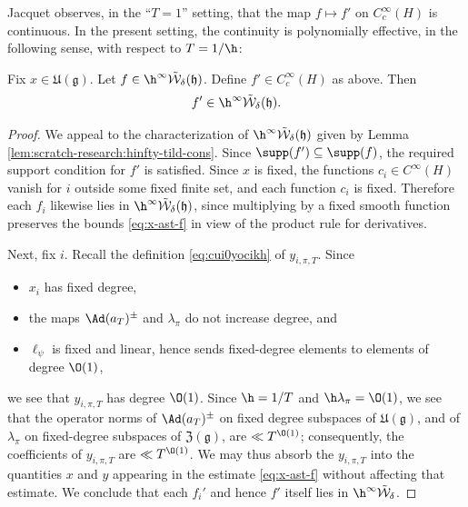 Jacquet observes, in the ``$T=1$'' setting, that the map $f \mapsto f'$ on $C_c^\infty(H)$ is continuous.  In the present setting, the continuity is polynomially effective, in the following sense, with respect to $T = 1/\h$:
\begin{lemma}\label{lem:scratch-research:fix-x-in}
  Fix $x \in \mathfrak{U}(\mathfrak{g})$.  Let $f \in \h^\infty \tilde{\mathcal{W}}_\delta(\mathfrak{h})$.   Define $f' \in C_c^\infty(H)$ as above.  Then
  \begin{equation*}
    f' \in \h^\infty \tilde{\mathcal{W}}_\delta(\mathfrak{h}).
  \end{equation*}
\end{lemma}
\begin{proof}
  We appeal to the characterization of $\h^\infty \tilde{\mathcal{W}}_\delta(\mathfrak{h})$ given by Lemma \ref{lem:scratch-research:hinfty-tild-cons}.  Since $\supp(f') \subseteq \supp(f)$, the required support condition for $f'$ is satisfied.  Since $x$ is fixed, the functions $c_i \in C^\infty(H)$ vanish for $i$ outside some fixed finite set, and each function $c_i$ is fixed.  Therefore each $f_i$ likewise lies in $\h^\infty \tilde{\mathcal{W}}_\delta(\mathfrak{h})$, since multiplying by a fixed smooth function preserves the bounds \eqref{eq:x-ast-f} in view of the product rule for derivatives.

  Next, fix $i$.  Recall the definition \eqref{eq:cui0yocikh} of $y_{i, \pi, T}$.  Since
  \begin{itemize}
  \item $x_i$ has fixed degree,
  \item the maps $\Ad(a_T)^{\pm}$ and $\lambda_\pi$ do not increase degree, and
  \item $\ell_\psi$ is fixed and linear, hence sends fixed-degree elements to elements of degree $\O(1)$,
  \end{itemize}
  we see that $y_{i,\pi,T}$ has degree $\O(1)$.  Since $\h = 1/T$ and $\h \lambda_\pi = \O(1)$, we see that the operator norms of $\Ad(a_T)^{\pm}$ on fixed degree subspaces of $\mathfrak{U}(\mathfrak{g})$, and of $\lambda_\pi$ on fixed-degree subspaces of $\mathfrak{Z}(\mathfrak{g})$, are $\ll T^{\O(1)}$; consequently, the coefficients of $y_{i,\pi,T}$ are $\ll T^{\O(1)}$.  We may thus absorb the $y_{i,\pi,T}$ into the quantities $x$ and $y$ appearing in the estimate \eqref{eq:x-ast-f} without affecting that estimate.  We conclude that each $f_i'$ and hence $f'$ itself lies in $\h^\infty \tilde{\mathcal{W}}_\delta$.
\end{proof}


